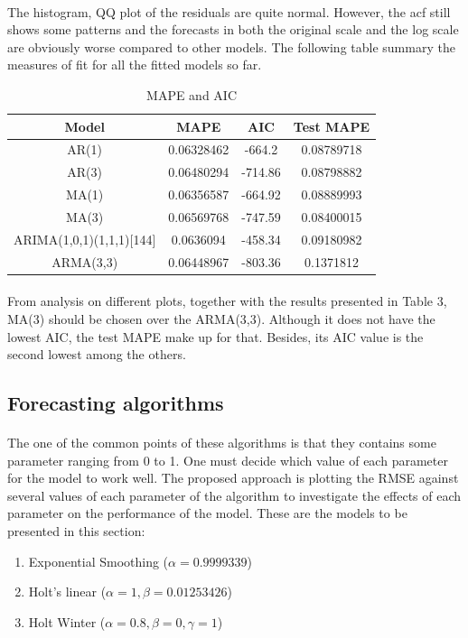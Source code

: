 \documentclass[12pt]{article}
\begin{document}
\paragraph{}
The histogram, QQ plot of the residuals are quite normal. However, the acf still shows some patterns and the forecasts in both the original scale and the log scale are obviously worse compared to other models. The following table summary the measures of fit for all the fitted models so far.
\begin{table}[H]
  \begin{center}
    \caption{MAPE and AIC}
    \label{tab:table3}
    \begin{tabular}{c|S|S|S} %
      \textbf{Model} & \textbf{MAPE} & \textbf{AIC}& \textbf{Test MAPE}\\
      \hline
      AR(1) & 0.06328462 & -664.2 & 0.08789718\\
      AR(3) & 0.06480294 & -714.86 & 0.08798882\\
      MA(1) & 0.06356587 & -664.92 & 0.08889993\\
      MA(3) & 0.06569768 & -747.59 & 0.08400015\\
      ARIMA(1,0,1)(1,1,1)[144] & 0.0636094 & -458.34 & 0.09180982\\
      ARMA(3,3) & 0.06448967 & -803.36 & 0.1371812 \\
    \end{tabular}
  \end{center}
\end{table}

\paragraph{}
From analysis on different plots, together with the results presented in Table 3, MA(3) should be chosen over the ARMA(3,3).
Although it does not have the lowest AIC, the test MAPE make up for that. Besides, its AIC value is the second lowest among the others. 

\subsection{Forecasting algorithms}
\paragraph{}
The one of the common points of these algorithms is that they contains some parameter ranging from 0 to 1. One must decide which value of each parameter for the model to work well. The proposed approach is plotting the RMSE against several values of each parameter of the algorithm to investigate the effects of each parameter on the performance of the model. These are the models to be presented in this section:
\begin{enumerate}
  \item Exponential Smoothing ($\alpha=0.9999339$)
  \item Holt's linear ($\alpha=1,\beta=0.01253426$)
  \item Holt Winter ($\alpha=0.8,\beta=0,\gamma=1$)
\end{enumerate}
\end{document}
